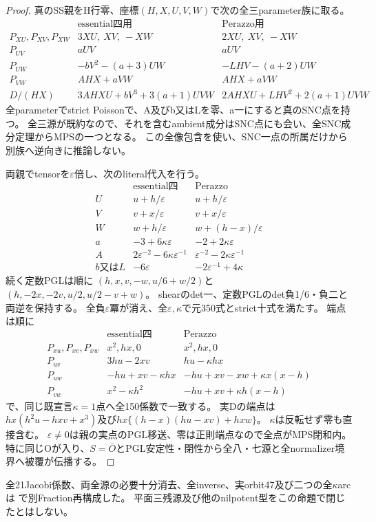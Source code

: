 \documentclass[a4paper,11pt]{ltjsarticle}
\theoremstyle{definition}
\begin{document}
\begin{proof}
真のSS親をH行零、座標$(H,X,U,V,W)$で次の全三parameter族に取る。
\[
\begin{array}{c|c|c}
 &\text{essential四用}&\text{Perazzo用}\\\hline
 P_{XU},P_{XV},P_{XW}&3XU,\ XV,\ -XW&2XU,\ XV,\ -XW\\
 P_{UV}&aUV&aUV\\
 P_{UW}&-bV^2-(a+3)UW&-LH V-(a+2)UW\\
 P_{VW}&AHX+aVW&AHX+aVW\\
 D/(HX)&3AHXU+bV^3+3(a+1)UVW&2AHXU+LH V^2+2(a+1)UVW
\end{array}
\]
全parameterでstrict Poissonで、A及びb又はLを零、a一にすると真のSNC点を持つ。
全三源が既約なので、それを含むambient成分はSNC点にも会い、全SNC成分定理からMPSの一つとなる。
この全像包含を使い、SNC一点の所属だけから別族へ逆向きに推論しない。

両親でtensorを$\varepsilon$倍し、次のliteral代入を行う。
\[
\begin{array}{c|c|c}
 &\text{essential四}&\text{Perazzo}\\\hline
 U&u+h/\varepsilon&u+h/\varepsilon\\
 V&v+x/\varepsilon&v+x/\varepsilon\\
 W&w+h/\varepsilon&w+(h-x)/\varepsilon\\
 a&-3+6\kappa\varepsilon&-2+2\kappa\varepsilon\\
 A&2\varepsilon^{-2}-6\kappa\varepsilon^{-1}&\varepsilon^{-2}-2\kappa\varepsilon^{-1}\\
 b\text{又は}L&-6\varepsilon&-2\varepsilon^{-1}+4\kappa
\end{array}
\]
続く定数PGLは順に
$(h,x,v,-w,u/6+w/2)$と$(h,-2x,-2v,u/2,u/2-v+w)$。
shearのdet一、定数PGLのdet負1/6・負二と両逆を保持する。
全負$\varepsilon$冪が消え、全$\varepsilon,\kappa$で元350式とstrict十式を満たす。
端点は順に
\[
\begin{array}{c|c|c}
 &\text{essential四}&\text{Perazzo}\\\hline
 P_{xu},P_{xv},P_{xw}&x^2,hx,0&x^2,hx,0\\
 P_{uv}&3hu-2xv&hu-\kappa hx\\
 P_{uw}&-hu+xv-\kappa hx&-hu+xv-xw+\kappa x(x-h)\\
 P_{vw}&x^2-\kappa h^2&-hu+xv+\kappa h(x-h)
\end{array}
\]
で、同じ既宣言$\kappa=1$点へ全150係数で一致する。
実Dの端点は$hx(h^2u-hxv+x^3)$及び$hx\{(h-x)(hu-xv)+hxw\}$。
$\kappa$は反転せず零も直接含む。
$\varepsilon\ne0$は親の実点のPGL移送、零は正則端点なので全点がMPS閉和内。
特に同じOが入り、$S=\overline O$とPGL安定性・閉性から全八・七源と全normalizer境界へ被覆が伝播する。
\end{proof}
全21Jacobi係数、両全源の必要十分消去、全inverse、実orbit47及び二つの全$\kappa$arcは
で別Fraction再構成した。
平面三残源及び他のnilpotent型をこの命題で閉じたとはしない。
\end{document}
